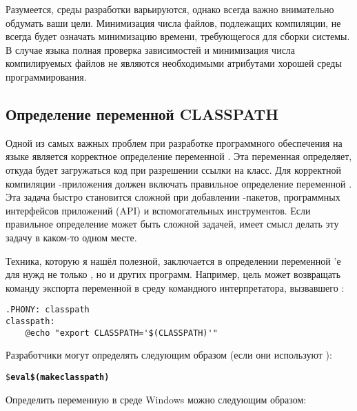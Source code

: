 Разумеется, среды разработки варьируются, однако всегда важно
внимательно обдумать ваши цели. Минимизация числа файлов, подлежащих
компиляции, не всегда будет означать минимизацию времени, требующегося
для сборки системы. В случае языка \Java{} полная проверка
зависимостей и минимизация числа компилируемых файлов не являются
необходимыми атрибутами хорошей среды программирования.

\subsection*{Определение переменной CLASSPATH}

Одной из самых важных проблем при разработке программного обеспечения
на языке \Java{} является корректное определение переменной
. Эта переменная определяет, откуда будет
загружаться код при разрешении ссылки на класс. Для корректной
компиляции \Java{}\hyp{}приложения \Makefile{} должен включать
правильное определение переменной . Эта задача
быстро становится сложной при добавлении \Java{}\hyp{}пакетов,
программных интерфейсов приложений (API) и вспомогательных
инструментов. Если правильное определение  может
быть сложной задачей, имеет смысл делать эту задачу в каком-то одном
месте.

Техника, которую я нашёл полезной, заключается в определении
переменной  \Makefile{}'е для нужд не только
\GNUmake{}, но и других программ. Например, цель 
может возвращать команду экспорта переменной  в
среду командного интерпретатора, вызвавшего \GNUmake{}:

{\footnotesize
\begin{verbatim}
.PHONY: classpath
classpath:
    @echo "export CLASSPATH='$(CLASSPATH)'"
\end{verbatim}
}

Разработчики могут определять  следующим образом
(если они используют ):

{\footnotesize
\begin{alltt}
\$ \textbf{eval \$(make classpath)}
\end{alltt}
}

Определить переменную  в среде Windows можно
следующим образом:

